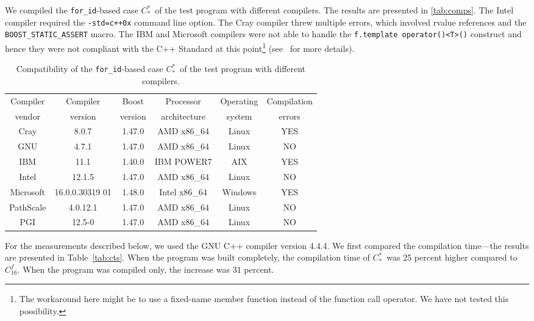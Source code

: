 \documentclass[10pt,a4paper]{article}
\theoremstyle{definition}\newtheorem{problem}{Problem}
\providecommand{\forid}{\texttt{for\_id}\xspace}
\providecommand{\casex}[1]{\ensuremath{#1}}
\providecommand{\caseA}{\casex{C_{16}^f}}
\providecommand{\caseE}{\casex{C_*^*}}
\begin{document}
We compiled the \forid-based case \caseE\ of the test program with different compilers. The results are presented in \autoref{tab:comps}. The Intel compiler required the \texttt{-std=c++0x} command line option. The Cray compiler threw multiple errors, which involved rvalue references and the \texttt{BOOST\_STATIC\_ASSERT} macro. The IBM and Microsoft compilers were not able to handle the \texttt{f.template operator()<T>()} construct and hence they were not compliant with the C++ Standard at this point\footnote{The workaround here might be to use a fixed-name member function instead of the function call operator. We have not tested this possibility.} (see~\cite[\S13.5/4 and \S14.2/4]{RefWorks:73} for more details).
\renewcommand{\arraystretch}{1.00}
\renewcommand{\tabcolsep}{1.6mm}
\begin{savenotes}
\begin{table}[t]
\caption{Compatibility of the \forid-based case \caseE\ of the test program with different compilers.}
\begin{center}
\begin{tabular}{cccccc}
\toprule
Compiler  & Compiler & Boost   & Processor    & Operating & Compilation \\
vendor    & version  & version & architecture & system    & errors      \\ \cmidrule(r){1-5} \cmidrule(l){6-6}
Cray      & 8.0.7    & 1.47.0  & AMD x86\_64  & Linux     & YES\\
GNU       & 4.7.1    & 1.47.0  & AMD x86\_64  & Linux     & NO          \\
IBM       & 11.1     & 1.40.0  & IBM POWER7   & AIX       & YES\\
Intel     & 12.1.5   & 1.47.0  & AMD x86\_64  & Linux     & NO\\
Microsoft & 16.0.0.30319 01 & 1.48.0 & Intel x86\_64 & Windows & YES\\
PathScale & 4.0.12.1 & 1.47.0  & AMD x86\_64  & Linux     & NO          \\
PGI       & 12.5-0   & 1.47.0  & AMD x86\_64  & Linux     & NO          \\
\bottomrule
\end{tabular}
\end{center}
\label{tab:comps}
\end{table}
\end{savenotes}

For the measurements described below, we used the GNU C++ compiler version 4.4.4. We first compared the compilation time---the results are presented in Table~\ref{tab:cts}. When the program was built completely, the compilation time of \caseE\ was 25 percent higher compared to \caseA. When the program was compiled only, the increase was 31 percent.
\end{document}
